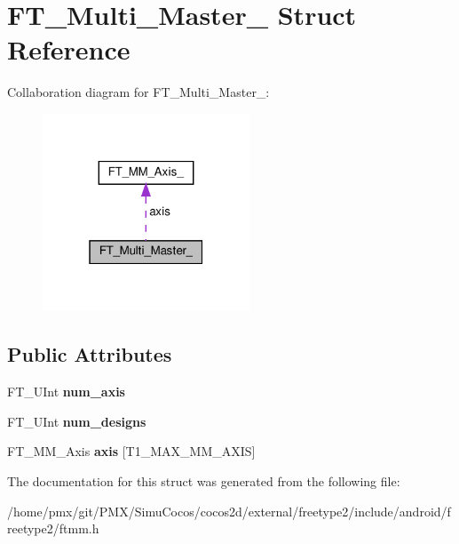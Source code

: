 \hypertarget{structFT__Multi__Master__}{}\section{F\+T\+\_\+\+Multi\+\_\+\+Master\+\_\+ Struct Reference}
\label{structFT__Multi__Master__}


Collaboration diagram for F\+T\+\_\+\+Multi\+\_\+\+Master\+\_\+\+:
\nopagebreak
\begin{figure}[H]
\begin{center}
\leavevmode
\includegraphics[width=175pt]{structFT__Multi__Master____coll__graph}
\end{center}
\end{figure}
\subsection*{Public Attributes}
\begin{DoxyCompactItemize}
\item 
\mbox{\label{structFT__Multi__Master___a90a0ace4e40b91912259ad52fc86fb6f}} 
F\+T\+\_\+\+U\+Int {\bfseries num\+\_\+axis}
\item 
\mbox{\label{structFT__Multi__Master___a78b797ee560f4b00795a7dce9656178d}} 
F\+T\+\_\+\+U\+Int {\bfseries num\+\_\+designs}
\item 
\mbox{\label{structFT__Multi__Master___a6074b894d7e1008d73f9af3a59f190b1}} 
F\+T\+\_\+\+M\+M\+\_\+\+Axis {\bfseries axis} \mbox{[}T1\+\_\+\+M\+A\+X\+\_\+\+M\+M\+\_\+\+A\+X\+IS\mbox{]}
\end{DoxyCompactItemize}


The documentation for this struct was generated from the following file\+:\begin{DoxyCompactItemize}
\item 
/home/pmx/git/\+P\+M\+X/\+Simu\+Cocos/cocos2d/external/freetype2/include/android/freetype2/ftmm.\+h\end{DoxyCompactItemize}
